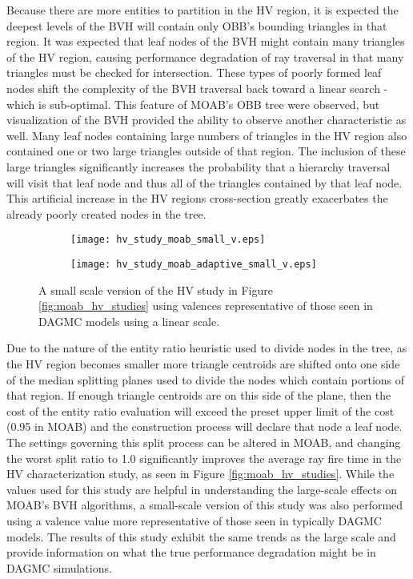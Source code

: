 Because there are more entities to partition in the HV region, it is expected
the deepest levels of the BVH will contain only OBB's bounding triangles in that
region. It was expected that leaf nodes of the BVH might contain many triangles
of the HV region, causing performance degradation of ray traversal in that many
triangles must be checked for intersection. These types of poorly formed leaf
nodes shift the complexity of the BVH traversal back toward a linear search -
which is sub-optimal. This feature of MOAB's OBB tree were observed, but
visualization of the BVH provided the ability to observe another characteristic
as well. Many leaf nodes containing large numbers of triangles in the HV region
also contained one or two large triangles outside of that region. The inclusion
of these large triangles significantly increases the probability that a
hierarchy traversal will visit that leaf node and thus all of the triangles
contained by that leaf node. This artificial increase in the HV regions
cross-section greatly exacerbates the already poorly created nodes in the tree.

\begin{figure}[H]
  \begin{subfigure}[b]{0.5\textwidth}
    \texttt{[image: hv\_study\_moab\_small\_v.eps]}
  \end{subfigure}
  \hfill
  \begin{subfigure}[b]{0.5\textwidth}
    \texttt{[image: hv\_study\_moab\_adaptive\_small\_v.eps]}
  \end{subfigure}
  \caption[Small scale study of the HV characterization using MOAB.]{A small scale version of the
    HV study in Figure \ref{fig:moab_hv_studies} using valences representative of those
    seen in DAGMC models using a linear scale.}
  \label{fig:moab_hv_studies_small_v}
\end{figure}

Due to the nature of the entity ratio heuristic used to divide nodes in the
tree, as the HV region becomes smaller more triangle centroids are shifted onto
one side of the median splitting planes used to divide the nodes which contain
portions of that region. If enough triangle centroids are on this side of the
plane, then the cost of the entity ratio evaluation will exceed the preset upper
limit of the cost (0.95 in MOAB) and the construction process will declare that
node a leaf node. The settings governing this split process can be altered in
MOAB, and changing the worst split ratio to 1.0 significantly improves the
average ray fire time in the HV characterization study, as seen in Figure
\ref{fig:moab_hv_studies}. While the values used for this study are helpful in
understanding the large-scale effects on MOAB's BVH algorithms, a small-scale
version of this study was also performed using a valence value more
representative of those seen in typically DAGMC models. The results of this study
exhibit the same trends as the large scale and provide information on
what the true performance degradation might be in DAGMC simulations.

